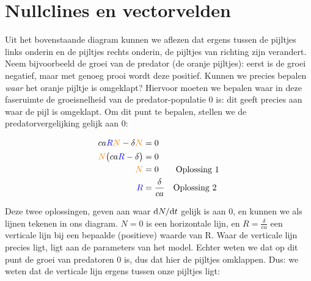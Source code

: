 \documentclass[
  a4paper,
]{scrbook}
\theoremstyle{definition}
\theoremstyle{remark}
\begin{document}
\hypertarget{nullclines-en-vectorvelden}{%
\section{Nullclines en vectorvelden}\label{nullclines-en-vectorvelden}}

Uit het bovenstaande diagram kunnen we aflezen dat ergens tussen de
pijltjes links onderin en de pijltjes rechts onderin, de pijltjes van
richting zijn verandert. Neem bijvoorbeeld de groei van de predator (de
oranje pijltjes): eerst is de groei negatief, maar met genoeg prooi
wordt deze positief. Kunnen we precies bepalen \emph{waar} het oranje
pijltje is omgeklapt? Hiervoor moeten we bepalen waar in deze faseruimte
de groeisnelheid van de predator-populatie 0 is: dit geeft precies aan
waar de pijl is omgeklapt. Om dit punt te bepalen, stellen we de
predatorvergelijking gelijk aan 0:

\begin{align*}
    \color{black}ca\color{blue}R\color{orange}N\color{black} - \delta \color{orange}N &= 0\\
    \color{orange}N\color{black} \big( \color{black}ca\color{blue}R\color{black} - \delta \big) &= 0 \\
    \color{orange}N\color{black} &= 0 \qquad \text{Oplossing 1} \\
    \color{blue}R\color{black} &= \frac{\delta}{ca} \quad \text{Oplossing 2}
\end{align*}

Deze twee oplossingen, geven aan waar \(\mathchoice{\frac{\mathrm{d}N}
{\mathrm{d}t}}{\mathrm{d}N/\mathrm{d}t}
{\mathrm{d}N/\mathrm{d}t}
{\mathrm{d}N/\mathrm{d}t}\) gelijk is aan 0, en kunnen we als lijnen
tekenen in ons diagram. \(N=0\) is een horizontale lijn, en
\(R=\frac{\delta}{ca}\) een verticale lijn bij een bepaalde (positieve)
waarde van R. Waar de verticale lijn precies ligt, ligt aan de
parameters van het model. Echter weten we dat op dit punt de groei van
predatoren 0 is, dus dat hier de pijltjes omklappen. Dus: we weten dat
de verticale lijn ergens tussen onze pijltjes ligt:
\end{document}

